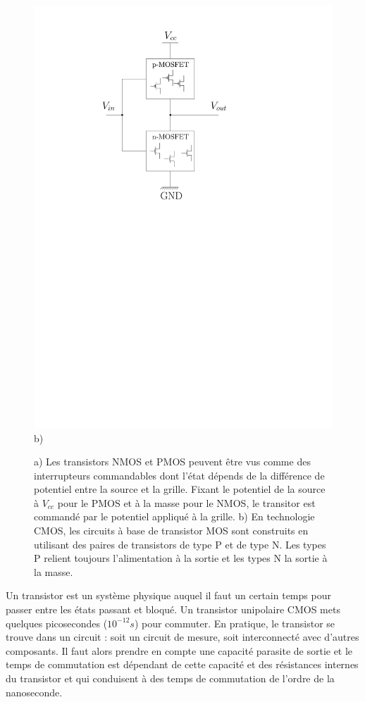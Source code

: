 \begin{figure}[htbp]
\begin{minipage}[c]{.25\linewidth}
\includegraphics[width=\columnwidth]{Figs/circuits_mos.pdf}\\\centering b)
   \end{minipage}
\caption{\label{fig:circuits_mos} a) Les transistors NMOS et PMOS peuvent être vus comme des interrupteurs commandables dont l'état dépends de la différence de potentiel entre la source et la grille. Fixant le potentiel de la source à $V_{cc}$ pour le PMOS et à la masse pour le NMOS, le transitor est commandé par le potentiel appliqué à la grille. b) En technologie CMOS, les circuits à base de transistor MOS sont construits en utilisant des paires de transistors de type P et de type N. Les types P relient toujours l'alimentation à la sortie et les types N la sortie à la masse.}
\end{figure}

Un transistor est un système physique auquel il faut un certain temps pour passer entre les états passant et bloqué. Un transistor unipolaire CMOS mets quelques picosecondes ($10^{-12}s$) pour commuter. En pratique, le transistor se trouve dans un circuit : soit un circuit de mesure, soit interconnecté avec d'autres composants. Il faut alors prendre en compte une capacité parasite de sortie et le temps de commutation est dépendant de cette capacité et des résistances internes du transistor et qui conduisent à des temps de commutation de l'ordre de la nanoseconde.

